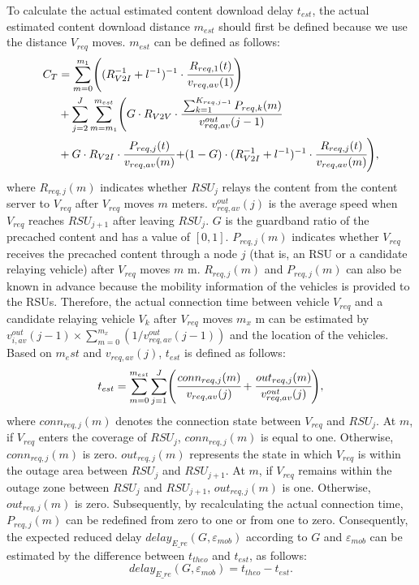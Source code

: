 \documentclass[electronics,aricle,accept,pdftex,moreauthors]{Definitions/mdpi}
\begin{document}
To calculate the actual estimated content download delay ${t}_{est}$, the actual estimated content download distance ${m}_{est}$ should first be defined because we use the distance $V_{req}$ moves. ${m}_{est}$ can be defined as follows:
\begin{equation}
    \begin{split}
        C_{T}&=\sum_{m=0}^{m_{1}}\left( (R_{V2I}^{-1} + l^{-1})^{-1} \cdot\cfrac{R_{req, 1}(t)}{v_{req, av}(1)}\right) \\
        &+\sum_{j=2}^{J}\sum_{m=m_{1}}^{m_{est}} \left( G \cdot R_{V2V} \cdot \cfrac{\sum_{k=1}^{K_{req,j-1}}P_{req, k}(m)}{v_{req, av}^{out}(j-1)}\right.\\
        &+G\cdot R_{V2I}\cdot\cfrac{P_{req, j}(t)}{v_{req, av}(m)}\left.+(1-G)\cdot (R_{V2I}^{-1} + l^{-1})^{-1} \cdot\cfrac{R_{req, j}(t)}{v_{req, av}(m)} \right),
    \end{split}
\end{equation}
where ${R}_{req, j}(m)$ indicates whether ${RSU}_{j}$ relays the content from the content server to ${V}_{req}$ after $V_{req}$ moves $m$ meters. %
 ${v}_{req, av}^{out}(j)$ is the average speed when ${V}_{req}$ reaches ${RSU}_{j+1}$ after leaving ${RSU}_{j}$. $G$ is the guardband ratio of the precached content and has a value of $[0, 1]$. ${P}_{req, j}(m)$ indicates whether ${V}_{req}$ receives the precached content through a node $j$ (that is, an RSU or a candidate relaying vehicle) after $V_{req}$ moves $m$ m.
${R}_{req, j}(m)$ and ${P}_{req, j}(m)$ can also be known in advance because the mobility information of the vehicles is provided to the RSUs.
Therefore, the actual connection time between vehicle ${V}_{req}$ and a candidate relaying vehicle ${V}_{k}$ after $V_{req}$ moves $m_{x}$ m can be estimated by $v_{i, av}^{out}(j-1) \times \sum_{m=0}^{m_{x}} (1 / v_{req, av}^{out}(j-1))$ and the location of the vehicles.
Based on $m_est$ and $v_{req, av}(j)$, $t_{est}$ is defined as follows:
\begin{equation}
    t_{est} = \sum_{m = 0}^{m_{est}} \sum_{j = 1}^{J} \left(\cfrac{conn_{req, j}(m)}{v_{req, av} (j)} + \cfrac{out_{req, j}(m)}{v_{req, av}^{out} (j)}\right),
\end{equation}
where $conn_{req, j}(m)$ denotes the connection state between $V_{req}$ and $RSU_{j}$. At $m$, if $V_{req}$ enters the coverage of $RSU_{j}$, $conn_{req, j}(m)$ is equal to one. Otherwise, $conn_{req, j}(m)$ is zero. $out_{req, j}(m)$ represents the state in which $V_{req}$ is within the outage area between $RSU_{j}$ and $RSU_{j+1}$. At $m$, if $V_{req}$ remains within the outage zone between $RSU_{j}$ and $RSU_{j+1}$, $out_{req, j}(m)$ is one. Otherwise, $out_{req, j}(m)$ is zero. Subsequently, by recalculating the actual connection time, ${P}_{req, j}(m)$ can be redefined from zero to one or from one to zero. Consequently, the expected reduced delay $delay_{E\_re}(G, \varepsilon_{mob})$ according to $G$ and $\varepsilon_{mob}$ can be estimated by the difference between $t_{theo}$ and $t_{est}$, as follows:
\begin{equation}
    delay_{E\_re}(G, \varepsilon_{mob}) = t_{theo}-t_{est}.
\end{equation}
\end{document}
